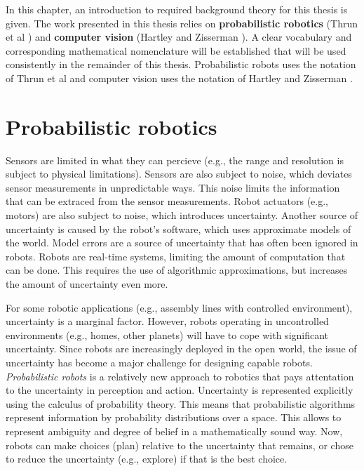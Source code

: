 In this chapter, an introduction to required background theory for this thesis is given.
The work presented in this thesis relies on \textbf{probabilistic robotics} (Thrun et al \cite{fox2005probabilistic}) and \textbf{computer vision} (Hartley and Zisserman \cite{Hartley2004}).
A clear vocabulary and corresponding mathematical nomenclature will be established that will be used consistently in the remainder of this thesis.
Probabilistic robots uses the notation of Thrun et al \cite{fox2005probabilistic} and computer vision uses the notation of Hartley and Zisserman \cite{Hartley2004}.

\section{Probabilistic robotics}
Sensors are limited in what they can percieve (e.g., the range and resolution is subject to physical limitations).
Sensors are also subject to noise, which deviates sensor measurements in unpredictable ways.
This noise limits the information that can be extraced from the sensor measurements.
Robot actuators (e.g., motors) are also subject to noise, which introduces uncertainty.
Another source of uncertainty is caused by the robot's software, which uses approximate models of the world.
Model errors are a source of uncertainty that has often been ignored in robots.
Robots are real-time systems, limiting the amount of computation that can be done.
This requires the use of algorithmic approximations, but increases the amount of uncertainty even more.

For some robotic applications (e.g., assembly lines with controlled environment), uncertainty is a marginal factor.
However, robots operating in uncontrolled environments (e.g., homes, other planets) will have to cope with significant uncertainty.
Since robots are increasingly deployed in the open world, the issue of uncertainty has become a major challenge for designing capable robots.
\textit{Probabilistic robots} is a relatively new approach to robotics that pays attentation to the uncertainty in perception and action.
Uncertainty is represented explicitly using the calculus of probability theory.
This means that probabilistic algorithms represent information by probability distributions over a space.
This allows to represent ambiguity and degree of belief in a mathematically sound way.
Now, robots can make choices (plan) relative to the uncertainty that remains, or chose to reduce the uncertainty (e.g., explore) if that is the best choice.

